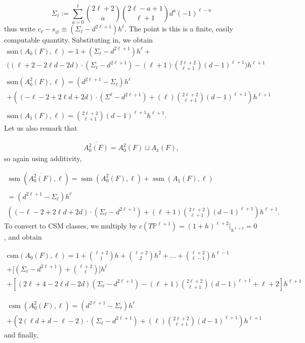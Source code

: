 \documentclass[11pt]{article}
\theoremstyle{plain}
\theoremstyle{definition}
\theoremstyle{definition}
\DeclareMathOperator{\csm}{csm}
\DeclareMathOperator{\ssm}{ssm}
\let\emptyset\varnothing
\begin{document}
\[
\Sigma_\ell:=\sum_{a=0}^\ell{2\ell+2\choose a}{2\ell-a+1\choose \ell+1}d^a(-1)^{\ell-a}
\]
thus write $c_\ell-s_\emptyset\equiv(\Sigma_\ell-d^{2\ell+1})h^\ell$. The point is this is a finite, easily computable quantity. Substituting in, we obtain
\begin{gather*}
\text{ssm}(A_0(F),\ell) = 1 + (\Sigma_\ell-d^{2\ell+1})h^\ell + \\
\Big((\ell+2-2\ell d-2d)\cdot (\Sigma_\ell-d^{2\ell+1}) - (\ell+1){2\ell+2\choose \ell+1}(d-1)^{\ell+1}\Big)h^{\ell+1}\\\\
\text{ssm}(A_0^2(F),\ell) =\left(d^{2\ell+1}-\Sigma_\ell\right)h^\ell \\
+ \left((-\ell-2+2\ell d+2d)\cdot (\Sigma^\ell-d^{2\ell+1})+(\ell){2\ell+2\choose \ell+1}(d-1)^{\ell+1} \right)h^{\ell+1}\\\\
\text{ssm}(A_1(F),\ell) = {2\ell+2\choose \ell+1}(d-1)^{\ell+1}h^{\ell+1}.
\end{gather*}
Let us also remark that 

\begin{gather*}
\overline{A_0^2(F)} = A_0^2(F) \sqcup A_1(F),
\end{gather*}
so again using additivity, 

\begin{gather*}
\ssm(\overline{A_0^2(F)},\ell) = \ssm(A_0^2(F),\ell)+\ssm(A_1(F),\ell)\\\\
=\left(d^{2\ell+1}-\Sigma_\ell\right)h^\ell \\
\left((-\ell-2+2\ell d+2d)\cdot (\Sigma_\ell-d^{2\ell+1})+(\ell+1){2\ell+2\choose \ell+1}(d-1)^{\ell+1} \right)h^{\ell+1}.
\end{gather*}
To convert to CSM classes, we multiply by $c(T\mathbb P^{\ell+1})=(1+h)^{\ell+2}\big|_{h^{\ell+2}}=0$, and obtain

\begin{gather*}
\text{csm}(A_0(F),\ell) 
=1+{\ell+2\choose 1}h+{\ell+2\choose 2}h^2 + \dots + {\ell+2\choose \ell-1}h^{\ell-1}\\
+\Big[(\Sigma_\ell-d^{2\ell+1}) + {\ell+2\choose \ell}\Big]h^\ell\\
+\left[(2\ell+4-2\ell d-2d)(\Sigma_\ell-d^{2\ell+1})-(\ell+1){2\ell+2\choose \ell+1}(d-1)^{\ell+1}+\ell+2\right]h^{\ell+1}
\end{gather*}



\begin{gather*}
\csm(A_0^2(F),\ell) =(d^{2\ell+1}-\Sigma_\ell)h^\ell \\
+\left(2(\ell d+d-\ell-2)\cdot (\Sigma_\ell-d^{2\ell+1})+(\ell){2\ell+2\choose \ell+1}(d-1)^{\ell+1} \right)h^{\ell+1}
\end{gather*}
and finally,
\end{document}
